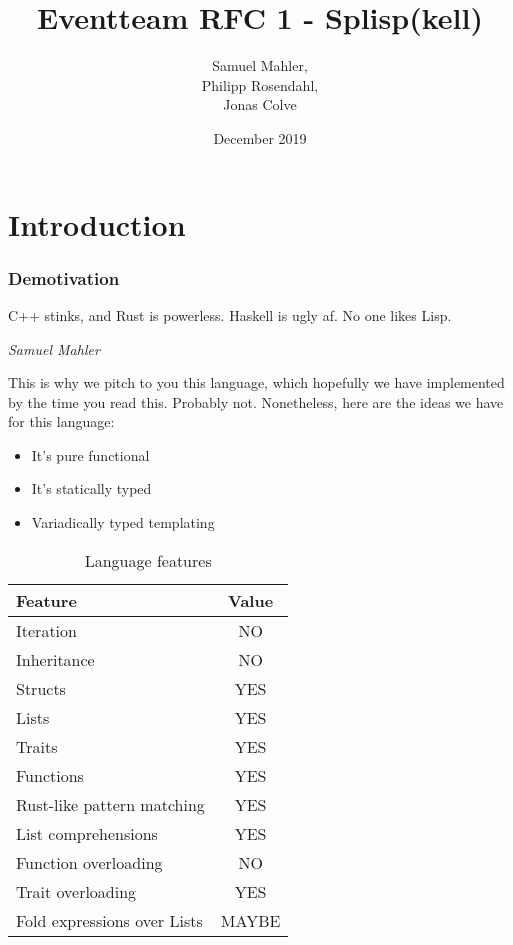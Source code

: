 \documentclass{scrartcl}
\title{Eventteam RFC 1 - Splisp(kell)}
\author{Samuel Mahler, \\
        Philipp Rosendahl, \\
        Jonas Colve}
\date{December 2019}
\begin{document}
\maketitle

\newpage

\tableofcontents

\newpage

\parindent0pt

\part{Introduction}

\section{Demotivation}

\epigraph{C++ stinks, and Rust is powerless. Haskell is ugly af. No one likes Lisp.}{\textit{Samuel Mahler}}

This is why we pitch to you this language, which hopefully we have implemented by the time you read this. Probably not. Nonetheless, here are the ideas we have for this language:

\begin{itemize}
    \item It's pure functional
    \item It's statically typed
    \item Variadically typed templating
\end{itemize}

\begin{table}[H]
    \centering
    \begin{tabular}{l|c}
        Feature                     & Value \\ \hline
        Iteration                   & NO    \\
        Inheritance                 & NO    \\
        Structs                     & YES   \\
        Lists                       & YES   \\
        Traits                      & YES   \\
        Functions                   & YES   \\
        Rust-like pattern matching  & YES   \\
        List comprehensions         & YES   \\
        Function overloading        & NO    \\
        Trait overloading           & YES\footnotemark   \\
        Fold expressions over Lists & MAYBE
    \end{tabular}
    \caption{Language features}
\end{table}
\end{document}
